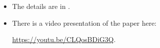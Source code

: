 \begin{frame}
  \begin{remark}
    \begin{itemize}
      \item The details are in .
      \item There is a video presentation of the paper here:
        \begin{center}
          \url{https://youtu.be/CLQosBDiG3Q}.
        \end{center}
    \end{itemize}
  \end{remark}
\end{frame}
